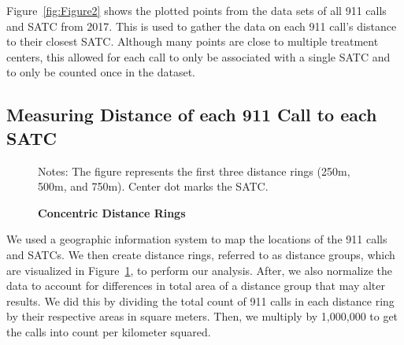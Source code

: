 \documentclass[12pt]{article}
\begin{document}
Figure~\ref{fig:Figure2} shows the plotted points from the data sets of all 911 calls and SATC from 2017. This is used to gather the data on each 911 call's distance to their closest SATC. Although many points are close to multiple treatment centers, this allowed for each call to only be associated with a single SATC and to only be counted once in the dataset. 



\subsection{Measuring Distance of each 911 Call to each SATC}
 


\begin{figure} 
\caption{\textbf{Concentric Distance Rings}}
\label{fig:Figure1}
\small{Notes: The figure represents the first three distance rings (250m, 500m, and 750m). Center dot marks the SATC.}
\end{figure}

 We used a geographic information system to map the locations of the 911 calls and SATCs. We then create distance rings, referred to as distance groups, which are visualized in Figure~\ref{fig:Figure1}, to perform our analysis. After, we also normalize the data to account for differences in total area of a distance group that may alter results. We did this by dividing the total count of 911 calls in each distance ring by their respective areas in square meters. Then, we multiply by 1,000,000 to get the calls into count per kilometer squared.
\end{document}
